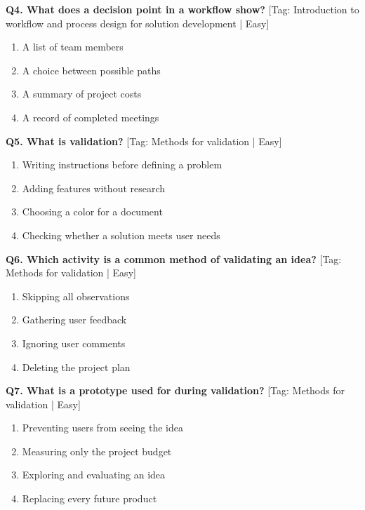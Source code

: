 \noindent\textbf{Q4. What does a decision point in a workflow show?} \hfill [Tag: Introduction to workflow and process design for solution development | Easy]
\begin{enumerate}[label=(\alph*),topsep=2pt,itemsep=1pt,partopsep=0pt,parsep=0pt]
    \item {A list of team members}
    \item {A choice between possible paths}
    \item {A summary of project costs}
    \item {A record of completed meetings}
\end{enumerate}
\vspace{2mm}

\noindent\textbf{Q5. What is validation?} \hfill [Tag: Methods for validation | Easy]
\begin{enumerate}[label=(\alph*),topsep=2pt,itemsep=1pt,partopsep=0pt,parsep=0pt]
    \item {Writing instructions before defining a problem}
    \item {Adding features without research}
    \item {Choosing a color for a document}
    \item {Checking whether a solution meets user needs}
\end{enumerate}
\vspace{2mm}

\noindent\textbf{Q6. Which activity is a common method of validating an idea?} \hfill [Tag: Methods for validation | Easy]
\begin{enumerate}[label=(\alph*),topsep=2pt,itemsep=1pt,partopsep=0pt,parsep=0pt]
    \item {Skipping all observations}
    \item {Gathering user feedback}
    \item {Ignoring user comments}
    \item {Deleting the project plan}
\end{enumerate}
\vspace{2mm}

\noindent\textbf{Q7. What is a prototype used for during validation?} \hfill [Tag: Methods for validation | Easy]
\begin{enumerate}[label=(\alph*),topsep=2pt,itemsep=1pt,partopsep=0pt,parsep=0pt]
    \item {Preventing users from seeing the idea}
    \item {Measuring only the project budget}
    \item {Exploring and evaluating an idea}
    \item {Replacing every future product}
\end{enumerate}
\vspace{2mm}

